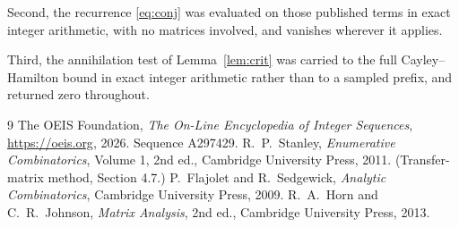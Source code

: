 \documentclass[11pt,a4paper]{article}
\theoremstyle{plain}
\theoremstyle{definition}
\begin{document}
Second, the recurrence \eqref{eq:conj} was evaluated on those published terms in exact
integer arithmetic, with no matrices involved, and vanishes wherever it applies.

Third, the annihilation test of Lemma~\ref{lem:crit} was carried to the full
Cayley--Hamilton bound in exact integer arithmetic rather than to a sampled prefix, and
returned zero throughout.

\begin{thebibliography}{9}
 The OEIS Foundation, \emph{The On-Line Encyclopedia of Integer
Sequences}, \url{https://oeis.org}, 2026. Sequence A297429.
 R.~P.~Stanley, \emph{Enumerative Combinatorics}, Volume 1, 2nd ed.,
Cambridge University Press, 2011. (Transfer-matrix method, Section 4.7.)
 P.~Flajolet and R.~Sedgewick, \emph{Analytic Combinatorics}, Cambridge
University Press, 2009.
 R.~A.~Horn and C.~R.~Johnson, \emph{Matrix Analysis}, 2nd ed., Cambridge
University Press, 2013.
\end{thebibliography}
\end{document}
